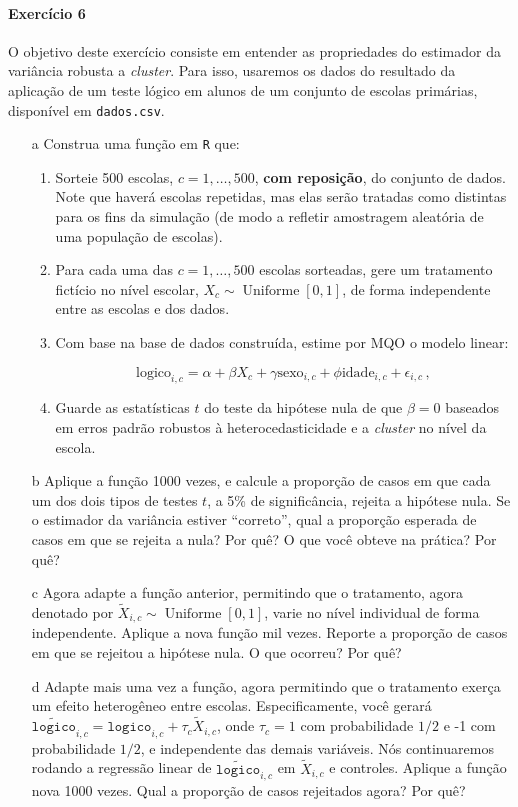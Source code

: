 \documentclass[10pt,a4paper]{article}
\begin{document}
 \paragraph{Exercício 6} O objetivo deste exercício consiste em entender as propriedades do estimador da variância robusta a \textit{cluster}. Para isso, usaremos os dados do resultado da aplicação de um teste lógico em alunos de um conjunto de escolas primárias, disponível em \texttt{dados.csv}.
 \begin{itemize}
 	\item[a] Construa uma função em \texttt{R} que:
 	\begin{enumerate}
 		\item Sorteie 500 escolas, $c=1,\ldots, 500$, \textbf{com reposição}, do conjunto de dados. Note que haverá escolas repetidas, mas elas serão tratadas como distintas para os fins da simulação (de modo a refletir amostragem aleatória de uma população de escolas).
 		\item Para cada uma das $c=1,\ldots, 500$ escolas sorteadas, gere um tratamento fictício no nível escolar, $X_c \sim \operatorname{Uniforme}[0,1]$, de forma independente entre as escolas e dos dados.
 		\item Com base na base de dados construída, estime por MQO o modelo linear:
 		
 		$$\text{logico}_{i,c} = \alpha + \beta X_{c} + \gamma \text{sexo}_{i,c} + \phi \text{idade}_{i,c} + \epsilon_{i,c}\, ,$$
 		\item Guarde as estatísticas $t$ do teste da hipótese nula de que $\beta =0$ baseados em erros padrão robustos à heterocedasticidade e a \textit{cluster} no nível da escola.
 	\end{enumerate}
 	\item[b] Aplique a função 1000 vezes, e calcule a proporção de casos em que cada um dos dois tipos de testes $t$, a 5\% de significância, rejeita a hipótese nula. Se o estimador da variância estiver ``correto'', qual a proporção esperada de casos em que se rejeita a nula?  Por quê? O que você obteve na prática? Por quê?
 	
 	\item[c] Agora adapte a função anterior, permitindo que o tratamento, agora denotado por $\tilde{X}_{i,c}\sim \operatorname{Uniforme}[0,1]$, varie no nível individual de forma independente. Aplique a nova função mil vezes. Reporte a proporção de casos em que se rejeitou a hipótese nula. O que ocorreu? Por quê?
 	\item[d] Adapte mais uma vez a função, agora permitindo que o tratamento exerça um efeito heterogêneo entre escolas. Especificamente, você gerará $\widetilde{\texttt{logico}}_{i,c} = \texttt{logico}_{i,c}  + \tau_c \tilde{X}_{i,c}$, onde $\tau_c = 1$ com probabilidade $1/2$ e -1 com probabilidade $1/2$, e independente das demais variáveis. Nós continuaremos rodando a regressão linear de $\tilde{\texttt{logico}}_{i,c}$ em $\tilde{X}_{i,c}$ e controles. Aplique a função nova 1000 vezes. Qual a proporção de casos rejeitados agora? Por quê? 
 \end{itemize}
\end{document}

